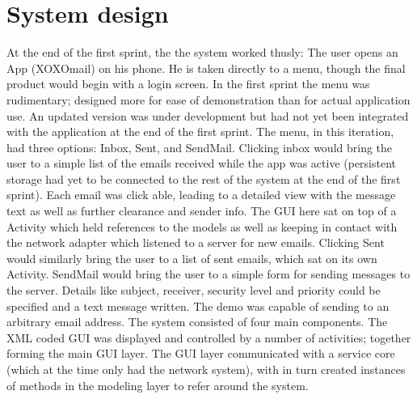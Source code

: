 \section{System design}
At the end of the first sprint, the the system worked thusly: The user opens an App (XOXOmail) on his phone. He is taken directly to a menu, though the final product would begin with a login screen. In the first sprint the menu was rudimentary; designed more for ease of demonstration than for actual application use. An updated version was under development but had not yet been integrated with the application at the end of the first sprint. The menu, in this iteration, had three options: Inbox, Sent, and SendMail.
\newline
\newline
Clicking inbox would bring the user to a simple list of the emails received while the app was active (persistent storage had yet to be connected to the rest of the system at the end of the first sprint). Each email was click able, leading to a detailed view with the message text as well as further clearance and sender info. The GUI here sat on top of a Activity which held references to the models as well as keeping in contact with the network adapter which listened to a server for new emails. Clicking Sent would similarly bring the user to a list of sent emails, which sat on its own Activity.
\newline
\newline
SendMail would bring the user to a simple form for sending messages to the server. Details like subject, receiver, security level and priority could be specified and a text message written. The demo was capable of sending to an arbitrary email address.
\newline
\newline
The system consisted of four main components. The XML coded GUI was displayed and controlled by a number of activities; together forming the main GUI layer. The GUI layer communicated with a service core (which at the time only had the network system), with in turn created instances of methods in the modeling layer to refer around the system.